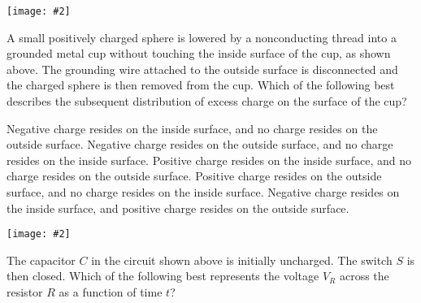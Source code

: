 \documentclass[12pt]{exam}
\newcommand{\pic}[2]{\texttt{[image: \#2]}}
\begin{document}
\begin{questions}
  \begin{center}
    \pic{.3}{cup}
  \end{center}
  \question A small positively charged sphere is lowered by a nonconducting
  thread into a grounded metal cup without touching the inside surface of the
  cup, as shown above. The grounding wire attached to the outside surface is
  disconnected and the charged sphere is then removed from the cup. Which of
  the following best describes the subsequent distribution of excess charge on
  the surface of the cup?
  \begin{choices}
    \choice Negative charge resides on the inside surface, and no charge
    resides on the outside surface.
    \choice Negative charge resides on the outside surface, and no charge
    resides on the inside surface.
    \choice Positive charge resides on the inside surface, and no charge
    resides on the outside surface.
    \choice Positive charge resides on the outside surface, and no charge
    resides on the inside surface.
    \choice Negative charge resides on the inside surface, and positive charge
    resides on the outside surface.
  \end{choices}
  \vspace{.7in}

  \begin{center}
    \pic{.35}{rc1}
  \end{center}
  \question The capacitor $C$ in the circuit shown above is initially
  uncharged. The switch $S$ is then closed. Which of the following best
  represents the voltage $V_R$ across the resistor $R$ as a function of time
  $t$?
  
  \begin{oneparchoices}
    \choice

    \choice


\end{oneparchoices}
\end{questions}
\end{document}
